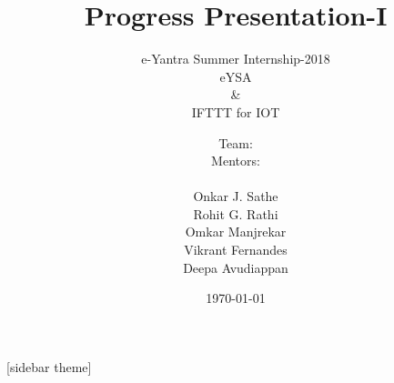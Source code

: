 \documentclass[10pt, a4paper]{beamer}
\begin{document}
	\title{Progress Presentation-I}
	\subtitle{e-Yantra Summer Internship-2018
	\vspace{0.1cm}
	\\ eYSA
	\\\&
	\\IFTTT for IOT}
	\author{
		\begin{minipage}[b]{0.40\textwidth}
			\raggedleft
			\hspace{2.2cm}
			Team:
			\newline
			\vspace{0.28cm}
			\\\hspace{1.95cm}Mentors:
			\newline\\\vspace{0.45cm}
		\end{minipage}%
		\begin{minipage}[b]{0.60\textwidth}
			\raggedright
			Onkar J. Sathe
			\\Rohit G. Rathi			
			\vspace{0.3cm}
			\\Omkar Manjrekar
			\\Vikrant Fernandes
			\\Deepa Avudiappan
		\end{minipage}%
	}
	\date{\today}
	\frame{\titlepage}

[sidebar theme]
\end{document}
